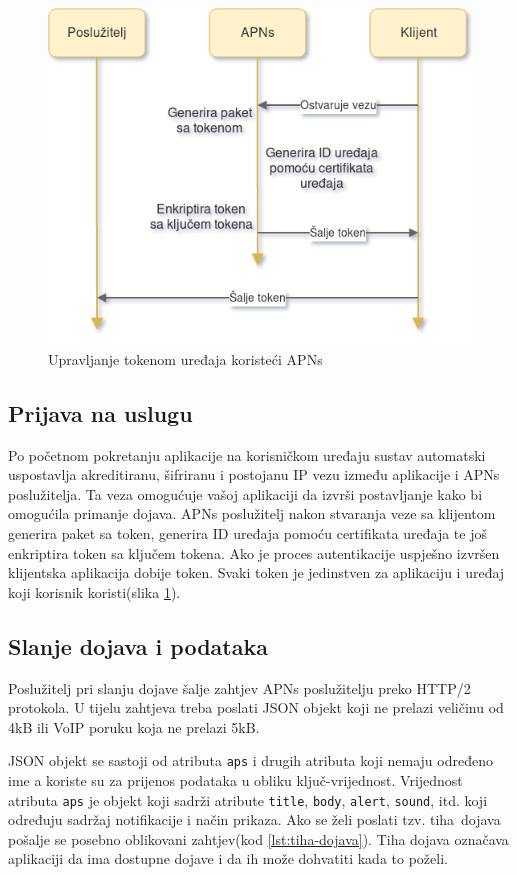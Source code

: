 \documentclass[times, utf8, zavrsni]{fer}
\begin{document}
\begin{figure}[htb]
\centering
\includegraphics[width=14cm]{img/apns.png}
\caption{Upravljanje tokenom uređaja koristeći APNs}
\label{fig:apns-image}
\end{figure}

\subsection{Prijava na uslugu}
Po početnom pokretanju aplikacije na korisničkom uređaju sustav automatski uspostavlja akreditiranu, šifriranu i postojanu IP vezu između aplikacije i APNs poslužitelja. Ta veza omogućuje vašoj aplikaciji da izvrši postavljanje kako bi omogućila primanje dojava. APNs poslužitelj nakon stvaranja veze sa klijentom generira paket sa token, generira ID uređaja pomoću certifikata uređaja te još enkriptira token sa ključem tokena. Ako je proces autentikacije uspješno izvršen klijentska aplikacija dobije token. Svaki token je jedinstven za aplikaciju i uređaj koji korisnik koristi(slika \ref{fig:apns-image}).

\subsection{Slanje dojava i podataka}
Poslužitelj pri slanju dojave šalje zahtjev APNs poslužitelju preko HTTP/2 protokola. U tijelu zahtjeva treba poslati JSON objekt koji ne prelazi veličinu od 4kB ili 	VoIP poruku koja ne prelazi 5kB.

JSON objekt se sastoji od atributa {\tt aps} i drugih atributa koji nemaju određeno ime a koriste su za prijenos podataka u obliku ključ-vrijednost. Vrijednost atributa {\tt aps} je objekt koji sadrži atribute {\tt title}, {\tt body}, {\tt alert}, {\tt sound}, itd. koji određuju sadržaj notifikacije i način prikaza. Ako se želi poslati tzv. \glqq tiha\grqq\  dojava pošalje se posebno oblikovani zahtjev(kod \ref{lst:tiha-dojava}). Tiha dojava označava aplikaciji da ima dostupne dojave i da ih može dohvatiti kada to poželi.\citep{apns2017}
\end{document}
